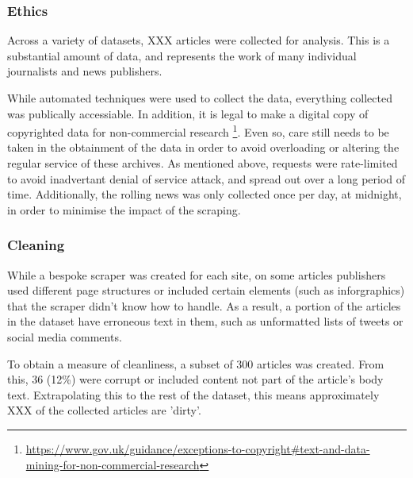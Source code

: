 \subsubsection{Ethics}
Across a variety of datasets, XXX articles were collected for analysis. This is a substantial amount of data, and represents the work of many individual journalists and news publishers. 

While automated techniques were used to collect the data, everything collected was publically accessiable. In addition, it is legal to make a digital copy of copyrighted data for non-commercial research \footnote{\url{https://www.gov.uk/guidance/exceptions-to-copyright#text-and-data-mining-for-non-commercial-research}}. Even so, care still needs to be taken in the obtainment of the data in order to avoid overloading or altering the regular service of these archives. As mentioned above, requests were rate-limited to avoid inadvertant denial of service attack, and spread out over a long period of time. Additionally, the rolling news was only collected once per day, at midnight, in order to minimise the impact of the scraping.

\subsubsection{Cleaning}
While a bespoke scraper was created for each site, on some articles publishers used different page structures or included certain elements (such as inforgraphics) that the scraper didn't know how to handle. As a result, a portion of the articles in the dataset have erroneous text in them, such as unformatted lists of tweets or social media comments.

To obtain a measure of cleanliness, a subset of 300 articles was created. From this, 36 (12\%) were corrupt or included content not part of the article's body text. Extrapolating this to the rest of the dataset, this means approximately XXX of the collected articles are 'dirty'.